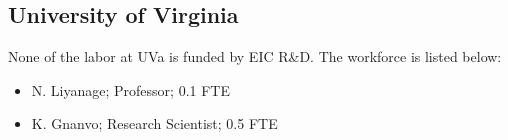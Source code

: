\subsection{University of Virginia} 
None of the labor at UVa is funded by EIC R\&D. The workforce is listed below:
\begin{itemize}
\item N. Liyanage; Professor; 0.1 FTE
\item K. Gnanvo; Research Scientist; 0.5 FTE
\end{itemize}